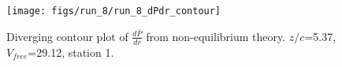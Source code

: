 \begin{figure}[H]
\centering
\texttt{[image: figs/run\_8/run\_8\_dPdr\_contour]}
\caption{Diverging contour plot of $\frac{d\bar{P}}{dr}$ from non-equilibrium theory. $z/c$=5.37, $V_{free}$=29.12, station 1.}
\label{fig:run_8_dPdr_contour}
\end{figure}


